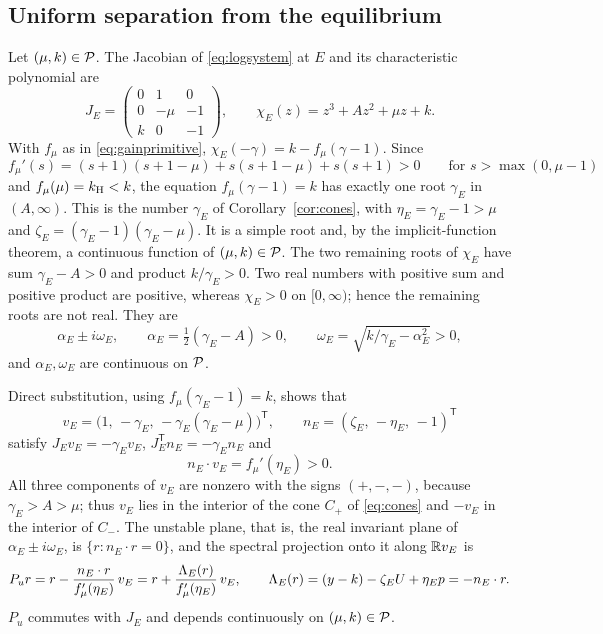 \subsection{Uniform separation from the equilibrium}
Let $(\mu,k)\in\mathcal P$. The Jacobian of \eqref{eq:logsystem} at $E$ and its characteristic polynomial are
\[
J_E=\begin{pmatrix}0&1&0\\0&-\mu&-1\\k&0&-1\end{pmatrix},\qquad
\chi_E(z)=z^3+Az^2+\mu z+k .
\]
With $f_\mu$ as in \eqref{eq:gainprimitive}, $\chi_E(-\gamma)=k-f_\mu(\gamma-1)$. Since
\[
f_\mu'(s)=(s+1)(s+1-\mu)+s(s+1-\mu)+s(s+1)>0\qquad\text{for }s>\max(0,\mu-1)
\]
and $f_\mu(\mu)=k_{\mathrm H}<k$, the equation $f_\mu(\gamma-1)=k$ has exactly one root $\gamma_E$ in $(A,\infty)$. This is the number $\gamma_E$ of Corollary~\ref{cor:cones}, with $\eta_E=\gamma_E-1>\mu$ and $\zeta_E=(\gamma_E-1)(\gamma_E-\mu)$. It is a simple root and, by the implicit-function theorem, a continuous function of $(\mu,k)\in\mathcal P$. The two remaining roots of $\chi_E$ have sum $\gamma_E-A>0$ and product $k/\gamma_E>0$. Two real numbers with positive sum and positive product are positive, whereas $\chi_E>0$ on $[0,\infty)$; hence the remaining roots are not real. They are
\[
\alpha_E\pm i\omega_E,\qquad
\alpha_E=\tfrac12(\gamma_E-A)>0,\qquad
\omega_E=\sqrt{k/\gamma_E-\alpha_E^2}>0,
\]
and $\alpha_E,\omega_E$ are continuous on $\mathcal P$.

Direct substitution, using $f_\mu(\gamma_E-1)=k$, shows that
\[
v_E=\bigl(1,\,-\gamma_E,\,-\gamma_E(\gamma_E-\mu)\bigr)^{\mathsf T},\qquad
n_E=(\zeta_E,\,-\eta_E,\,-1)^{\mathsf T}
\]
satisfy $J_Ev_E=-\gamma_Ev_E$, $J_E^{\mathsf T}n_E=-\gamma_En_E$ and
\[
n_E\cdot v_E=f_\mu'(\eta_E)>0 .
\]
All three components of $v_E$ are nonzero with the signs $(+,-,-)$, because $\gamma_E>A>\mu$; thus $v_E$ lies in the interior of the cone $C_+$ of \eqref{eq:cones} and $-v_E$ in the interior of $C_-$. The unstable plane, that is, the real invariant plane of $\alpha_E\pm i\omega_E$, is $\{r:n_E\cdot r=0\}$, and the spectral projection onto it along $\mathbb R v_E$ is
\begin{equation}\label{cpt:eq:Pu}
P_ur=r-\frac{n_E\cdot r}{f_\mu'(\eta_E)}\,v_E
=r+\frac{\Lambda_E(r)}{f_\mu'(\eta_E)}\,v_E,\qquad
\Lambda_E(r)=(y-k)-\zeta_EU+\eta_Ep=-n_E\cdot r .
\end{equation}
$P_u$ commutes with $J_E$ and depends continuously on $(\mu,k)\in\mathcal P$.


